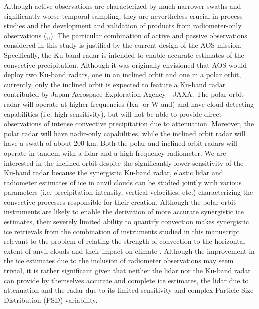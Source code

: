 \documentclass[12pt]{article}
\begin{document}
\newline
Although active observations are characterized by much narrower swaths and 
significantly worse temporal sampling, they are nevertheless crucial in process 
studies and the development and validation of products from radiometer-only
observations (\cite{stephens2008},\cite{sano2022},\cite{stubenrauch2021}).  The
particular combination of active and passive observations considered in this
study is justified by the current design of the AOS mission. Specifically,
the Ku-band radar is intended to enable accurate estimates of 
the convective precipitation.  Although it was originally envisioned that AOS would
deploy two Ku-band radars, one in an inclined orbit and one in a polar orbit, currently, only
the inclined orbit is expected to feature a Ku-band radar contributed by 
Japan Aerospace Exploration Agency - JAXA.  
The polar orbit radar will operate at higher-frequencies (Ka- or W-and) and 
have cloud-detecting capabilities (i.e. high-sensitivity), but
will not be able to provide direct observations of intense convective precipitation
due to attenuation. Moreover, the polar radar will have nadir-only capabilities,
while the inclined orbit radar will have a
swath of about 200 km.  Both the polar and inclined orbit radars will operate
in tandem with a lidar and a high-frequency radiometer.  We are interested
in the inclined orbit despite the significantly lower sensitivity of the 
Ku-band radar because the synergistic Ku-band radar, elastic lidar and radiometer
estimates of ice in anvil clouds can be studied jointly with various parameters
(i.e. precipitation intensity, vertical velocities, etc.) characterizing the
convective processes responsible for their creation.  Although 
the polar orbit instruments are likely to enable the derivation of more accurate 
synergistic ice estimates, their severely limited ability to quantify convection
makes synergistic ice retrievals from the combination of instruments studied in
this manuscript relevant to the problem of relating the strength of convection to
the horizontal extent of anvil clouds and their impact on climate \cite{hartmann2016}.
Although the improvement in the ice estimates due to the inclusion of radiometer 
observations may seem trivial, it is rather significant given that neither the
lidar nor the Ku-band radar can provide by themselves accurate and complete 
ice estimates, the lidar
due to attenuation and the radar due to its limited sensitivity and complex Particle
Size Distribution (PSD) variability. \\
\end{document}
